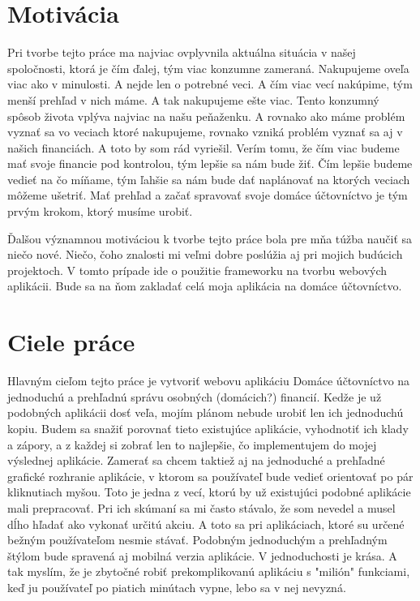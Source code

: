 \documentclass[12pt]{book}
\begin{document}
\section{Motivácia}
Pri tvorbe tejto práce ma najviac ovplyvnila aktuálna situácia v našej spoločnosti, ktorá je čím ďalej, tým viac konzumne zameraná. Nakupujeme oveľa viac ako v minulosti. A nejde len o potrebné veci. A čím viac vecí nakúpime, tým menší prehľad v nich máme. A tak nakupujeme ešte viac. Tento konzumný spôsob života vplýva najviac na našu peňaženku. A rovnako ako máme problém vyznať sa vo veciach ktoré nakupujeme, rovnako vzniká problém vyznať sa aj v našich financiách. A toto by som rád vyriešil. Verím tomu, že čím viac budeme mať svoje financie pod kontrolou, tým lepšie sa nám bude žiť. Čím lepšie budeme vedieť na čo míňame, tým ľahšie sa nám bude dať naplánovať na ktorých veciach môžeme ušetriť. Mať prehľad a začať spravovať svoje domáce účtovníctvo je tým prvým krokom, ktorý musíme urobiť.

Ďalšou významnou motiváciou k tvorbe tejto práce bola pre mňa túžba naučiť sa niečo nové. Niečo, čoho znalosti mi veľmi dobre poslúžia aj pri mojich budúcich projektoch. V tomto prípade ide o použitie frameworku na tvorbu webových aplikácii. Bude sa na ňom zakladať celá moja aplikácia na domáce účtovníctvo.   

\section{Ciele práce}
Hlavným cieľom tejto práce je vytvoriť webovu aplikáciu Domáce účtovníctvo na jednoduchú a prehľadnú správu osobných (domácich?) financií. Kedže je už podobných aplikácii dosť veľa, mojím plánom nebude urobiť len ich jednoduchú kopiu. Budem sa snažiť porovnať tieto existujúce aplikácie, vyhodnotiť ich klady a zápory, a z každej si zobrať len to najlepšie, čo implementujem do mojej výslednej aplikácie. Zamerať sa chcem taktiež aj na jednoduché a prehľadné grafické rozhranie aplikácie, v ktorom sa používateľ bude vedieť orientovať po pár kliknutiach myšou. Toto je jedna z vecí, ktorú by už existujúci podobné aplikácie mali prepracovať. Pri ich skúmaní sa mi často stávalo, že som nevedel a musel dĺho hľadať ako vykonať určitú akciu. A toto sa pri aplikáciach, ktoré su určené bežným používateľom nesmie stávať. Podobným jednoduchým a prehľadným štýlom bude spravená aj mobilná verzia aplikácie. V jednoduchosti je krása. A tak myslím, že je zbytočné robiť prekomplikovanú aplikáciu s "milión" funkciami, keď ju používateľ po piatich minútach vypne, lebo sa v nej nevyzná.
\end{document}
